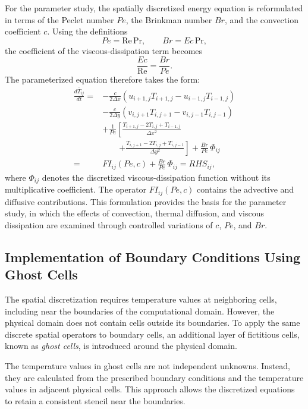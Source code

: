 For the parameter study, the spatially discretized energy
equation is reformulated in terms of the Peclet number $Pe$,
the Brinkman number $Br$, and the convection coefficient
$c$. Using the definitions
\[
Pe=\mathrm{Re}\,\mathrm{Pr},
\qquad
Br=Ec\,\mathrm{Pr},
\]
the coefficient of the viscous-dissipation term becomes
\[
\frac{Ec}{\mathrm{Re}}=\frac{Br}{Pe}.
\]
The parameterized equation therefore takes the form:
\begin{equation}
\boxed{
\begin{aligned}
\frac{d\overline{T}_{ij}}{dt}
={}&
-\frac{c}{2\Delta x}
\left(
u_{i+1,j}T_{i+1,j}
-u_{i-1,j}T_{i-1,j}
\right)
\\[0.15cm]
&-\frac{c}{2\Delta y}
\left(
v_{i,j+1}T_{i,j+1}
-v_{i,j-1}T_{i,j-1}
\right)
\\[0.15cm]
&+\frac{1}{Pe}
\left[
\frac{T_{i+1,j}-2T_{i,j}+T_{i-1,j}}{\Delta x^2}
\right.
\\
&\qquad\left.
+\frac{T_{i,j+1}-2T_{i,j}+T_{i,j-1}}{\Delta y^2}
\right]
+\frac{Br}{Pe}\,\Phi_{ij}
\\[0.15cm]
={}&FI_{ij}(Pe,c)
+\frac{Br}{Pe}\,\Phi_{ij}
=RHS_{ij},
\end{aligned}
}
\label{eq:parameterized_energy}
\end{equation}
where $\Phi_{ij}$ denotes the discretized
viscous-dissipation function without its multiplicative
coefficient. The operator $FI_{ij}(Pe,c)$ contains the
advective and diffusive contributions. This formulation
provides the basis for the parameter study, in which the
effects of convection, thermal diffusion, and viscous
dissipation are examined through controlled variations of
$c$, $Pe$, and $Br$.

\subsection{Implementation of Boundary Conditions Using Ghost Cells}
\label{subsec:ghost_cell_boundary_conditions}

The spatial discretization requires temperature values at neighboring
cells, including near the boundaries of the computational domain.
However, the physical domain does not contain cells outside its
boundaries. To apply the same discrete spatial operators to boundary
cells, an additional layer of fictitious cells, known as
\textit{ghost cells}, is introduced around the physical domain.

The temperature values in ghost cells are not independent unknowns.
Instead, they are calculated from the prescribed boundary conditions
and the temperature values in adjacent physical cells. This approach
allows the discretized equations to retain a consistent stencil near
the boundaries.

